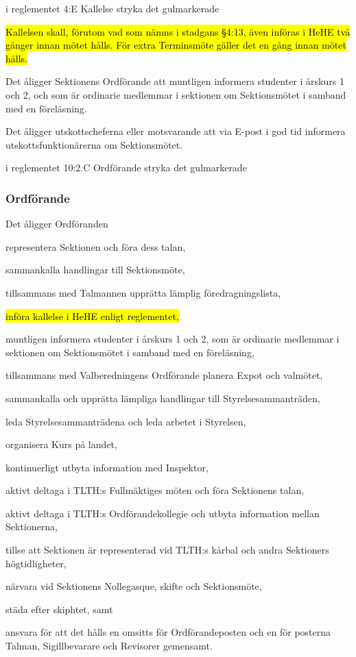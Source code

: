 \documentclass[../_main/handlingar.tex]{subfiles}
\begin{document}
\begin{attsatser}
    \att i reglementet 4:E Kallelse stryka det gulmarkerade

    \hl{Kallelsen skall, förutom vad som nämns i stadgans §4:13, även införas i HeHE två gånger innan mötet hålls. För extra Terminsmöte gäller det en gång innan mötet hålls.} 

    Det åligger Sektionens Ordförande att muntligen informera studenter i årskurs 1 och 2, och som är ordinarie medlemmar i sektionen om Sektionsmötet i samband med en föreläsning. 

    Det åligger utskottscheferna eller motsvarande att via E-post i god tid informera utskottsfunktionärerna om Sektionsmötet.

 \newpage
    \att i reglementet 10:2.C Ordförande stryka det gulmarkerade

    \subsubsection{Ordförande}
    Det åligger Ordföranden
    \begin{attlist}
    \item representera Sektionen och föra dess talan,
    \item sammankalla handlingar till Sektionsmöte,
    \item tillsammans med Talmannen upprätta lämplig föredragningslista,
    \item \hl{införa kallelse i HeHE enligt reglementet,}
    \item muntligen informera studenter i årskurs 1 och 2, som är ordinarie medlemmar i sektionen om Sektionsmötet i samband med en föreläsning,
    \item tillsammans med Valberedningens Ordförande planera Expot och valmötet,
    \item sammankalla och upprätta lämpliga handlingar till Styrelsesammanträden,
    \item leda Styrelsesammanträdena och leda arbetet i Styrelsen,
    \item organisera Kurs på landet,
    \item kontinuerligt utbyta information med Inspektor,
    \item aktivt deltaga i TLTH:s Fullmäktiges möten och föra Sektionens talan,
    \item aktivt deltaga i TLTH:s Ordförandekollegie och utbyta information mellan Sektionerna,
    \item tillse att Sektionen är representerad vid TLTH:s kårbal och andra Sektioners högtidligheter,
    \item närvara vid Sektionens Nollegasque, skifte och Sektionsmöte,
    \item städa efter skiphtet, samt
    \item ansvara för att det hålls en omsitts för Ordförandeposten och en för posterna Talman, Sigillbevarare och Revisorer gemensamt.
    \end{attlist}


\end{attsatser}
\end{document}
